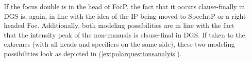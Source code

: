 If the focus double is in the head of FocP, the fact that it occurs clause-finally in DGS is, again, in line with the idea of the IP being moved to SpecIntP or a right-headed Foc\textdegree . Additionally, both modeling possibilities are in line with the fact that the intensity peak of the non-manuals is clause-final in DGS. If taken to the extremes (with all heads and specifiers on the same side), these two modeling possibilities look as depicted in (\ref{ex:polarquestionsanalyis}). 
%
%
%
%
%
%
%
%
%
%

\clearpage


